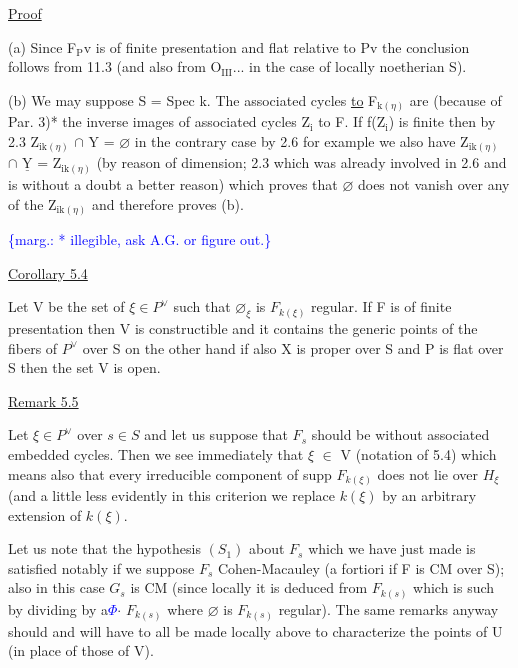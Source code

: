 \documentclass[11pt]{article}
\newcommand{\scanpage}[1]{\par\bigskip\noindent{\small\sffamily[scan #1]}\par}
\newcommand{\mspage}[1]{{\small\sffamily[p.\,#1]}}
\newcommand{\hand}[1]{\textcolor{blue}{#1}}
\newcommand{\margin}[1]{\textcolor{blue}{\{\textsf{marg.:} #1\}}}
\newcommand{\uline}[1]{\underline{#1}}
\begin{document}
\uline{Proof}

(a) Since F$_{\mathrm{P}}$v is of finite presentation and flat relative to
Pv the conclusion follows from 11.3 (and also from O$_{\mathrm{III}}$... in the
case of locally noetherian S).

(b) We may suppose S = Spec k.  The associated cycles \uline{to} F$_{\mathrm{k}(\eta)}$
are (because of Par. 3)* the inverse images of associated cycles
Z$_{\mathrm{i}}$ to F.  If f(Z$_{\mathrm{i}}$) is finite then by 2.3 Z$_{\mathrm{ik}(\eta)}$ $\cap$ Y = $\varnothing$ in the
contrary case by 2.6 for example we also have Z$_{\mathrm{ik}(\eta)}$ $\cap$ $\underline{\mathrm{Y}}$ = Z$_{\mathrm{ik}(\eta)}$
(by reason of dimension; 2.3 which was already involved in 2.6 and
is without a doubt a better reason) which proves that $\varnothing$ does not
vanish over any of the Z$_{\mathrm{ik}(\eta)}$ and therefore proves (b).

\margin{* illegible, ask A.G. or figure out.}

\clearpage
\scanpage{24/28}
\mspage{28}

\uline{Corollary 5.4}

Let V be the set of $\xi \in P^{\vee}$ such that $\varnothing_{\xi}$ is $F_{k(\xi)}$ regular. If F
is of finite presentation then V is constructible and it contains
the generic points of the fibers of $P^{\vee}$ over S on the other hand if
also X is proper over S and P is flat over S then the set V is
open.

\uline{Remark 5.5}

Let $\xi \in P^{\vee}$ over $s \in S$ and let us suppose that $F_{s}$ should be
without associated embedded cycles. Then we see immediately that $\xi$
$\in$ V (notation of 5.4) which means also that every irreducible
component of supp $F_{k(\xi)}$ does not lie over $H_{\xi}$ (and a little less
evidently in this criterion we replace $k(\xi)$ by an arbitrary
extension of $k(\xi)$.

Let us note that the hypothesis $(S_{1})$ about $F_{s}$ which we have
just made is satisfied notably if we suppose $F_{s}$ Cohen-Macauley (a
fortiori if F is CM over S); also in this case $G_{s}$ is CM (since
locally it is deduced from $F_{k(s)}$ which is such by dividing by a\hand{$\Phi$}$\cdot$
$F_{k(s)}$ where $\varnothing$ is $F_{k(s)}$ regular). The same remarks anyway should and
will have to all be made locally above to characterize the points
of U (in place of those of V).
\end{document}
